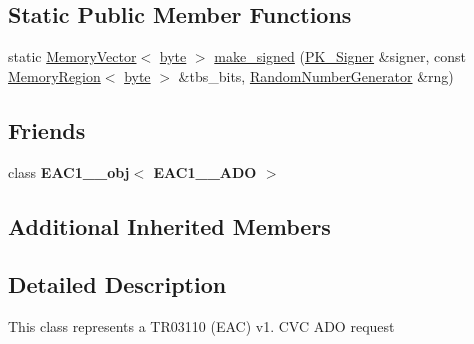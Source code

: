 \subsection*{Static Public Member Functions}
\begin{DoxyCompactItemize}
\item 
static \hyperlink{classBotan_1_1MemoryVector}{Memory\-Vector}$<$ \hyperlink{namespaceBotan_a7d793989d801281df48c6b19616b8b84}{byte} $>$ \hyperlink{classBotan_1_1EAC1__1__ADO_afac132428e88d7597d49de32647ab125}{make\-\_\-signed} (\hyperlink{classBotan_1_1PK__Signer}{P\-K\-\_\-\-Signer} \&signer, const \hyperlink{classBotan_1_1MemoryRegion}{Memory\-Region}$<$ \hyperlink{namespaceBotan_a7d793989d801281df48c6b19616b8b84}{byte} $>$ \&tbs\-\_\-bits, \hyperlink{classBotan_1_1RandomNumberGenerator}{Random\-Number\-Generator} \&rng)
\end{DoxyCompactItemize}
\subsection*{Friends}
\begin{DoxyCompactItemize}
\item 
\hypertarget{classBotan_1_1EAC1__1__ADO_a88c2158450feddd41d48d8dfc76570bb}{class {\bfseries E\-A\-C1\-\_\-\_\-obj$<$ E\-A\-C1\-\_\-\_\-\-A\-D\-O $>$}}\label{classBotan_1_1EAC1__1__ADO_a88c2158450feddd41d48d8dfc76570bb}

\end{DoxyCompactItemize}
\subsection*{Additional Inherited Members}


\subsection{Detailed Description}
This class represents a T\-R03110 (E\-A\-C) v1. C\-V\-C A\-D\-O request 

